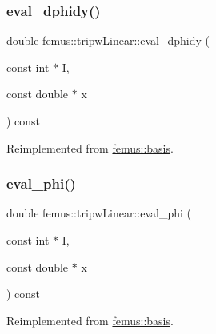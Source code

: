 \mbox{\label{classfemus_1_1tripw_linear_a9cf54f3f041baa9d16caaa9e4ccf9040}} 
\subsubsection{\texorpdfstring{eval\+\_\+dphidy()}{eval\_dphidy()}}
{\footnotesize\ttfamily double femus\+::tripw\+Linear\+::eval\+\_\+dphidy (\begin{DoxyParamCaption}\item[{const int $\ast$}]{I,  }\item[{const double $\ast$}]{x }\end{DoxyParamCaption}) const\hspace{0.3cm}{\ttfamily [virtual]}}



Reimplemented from \mbox{\hyperlink{classfemus_1_1basis_a2819fac9aae797156b9efec8a0b85cc1}{femus\+::basis}}.

\mbox{\label{classfemus_1_1tripw_linear_a64d5b18239123c1983bc7342a1525069}} 
\subsubsection{\texorpdfstring{eval\+\_\+phi()}{eval\_phi()}}
{\footnotesize\ttfamily double femus\+::tripw\+Linear\+::eval\+\_\+phi (\begin{DoxyParamCaption}\item[{const int $\ast$}]{I,  }\item[{const double $\ast$}]{x }\end{DoxyParamCaption}) const\hspace{0.3cm}{\ttfamily [virtual]}}



Reimplemented from \mbox{\hyperlink{classfemus_1_1basis_a89b0797cdccffae5ff6d059b32016ae5}{femus\+::basis}}.

\mbox{\label{classfemus_1_1tripw_linear_adaef066660723a22e68dd30b91d55357}} 
